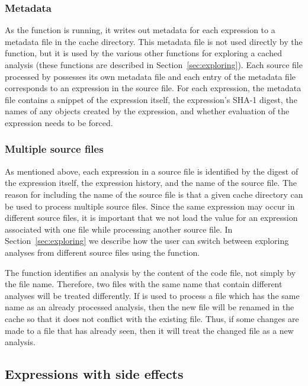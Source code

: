 \documentclass[nojss]{jss}
\begin{document}
\subsubsection{Metadata}

As the  function is running, it writes out metadata for
each expression to a metadata file in the cache directory.  This
metadata file is not used directly by the  function, but
it is used by the various other functions for exploring a cached
analysis (these functions are described in
Section~\ref{sec:exploring}).  Each source file processed by
 possesses its own metadata file and each entry of the
metadata file corresponds to an expression in the source file.  For
each expression, the metadata file contains a snippet of the
expression itself, the expression's SHA-1 digest, the names of any
 objects created by the expression, and whether evaluation
of the expression needs to be forced.


\subsubsection{Multiple source files}

As mentioned above, each expression in a source file is identified by
the digest of the expression itself, the expression history, and the
name of the source file.  The reason for including the name of the
source file is that a given cache directory can be used to process
multiple source files.  Since the same expression may occur in
different source files, it is important that we not load the value for
an expression associated with one file while processing another source
file.  In Section~\ref{sec:exploring} we describe how the user can
switch between exploring analyses from different source files using
the  function.

The  function identifies an analysis by the content of
the code file, not simply by the file name.  Therefore, two files with
the same name that contain different analyses will be treated
differently.  If  is used to process a file which has the
same name as an already processed analysis, then the new file will be
renamed in the cache so that it does not conflict with the existing
file.  Thus, if some changes are made to a file that  has
already seen, then it will treat the changed file as a new analysis.


\subsection{Expressions with side effects}
\label{sec:sideeffects}
\end{document}
